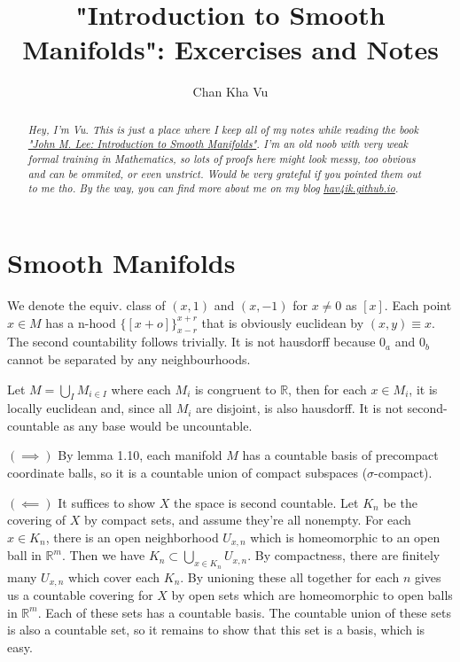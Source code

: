 \documentclass[a4paper]{article}
\title{"Introduction to Smooth Manifolds": Excercises and Notes}
\author{Chan Kha Vu}
\date{}
\begin{document}
\maketitle
\begin{abstract}
\textit{
    Hey, I'm Vu. This is just a place where I keep all of my notes while reading
    the book \href{https://www.springer.com/gp/book/9780387217529}{"John M. Lee: Introduction to Smooth Manifolds"}.
    I'm an old noob with very weak formal training in Mathematics, so lots of proofs here
    might look messy, too obvious and can be ommited, or even unstrict. Would be very
    grateful if you pointed them out to me tho.
    By the way, you can find more about me on my blog \href{https://hav4ik.github.io}{hav4ik.github.io}.
}
\end{abstract}


\section{Smooth Manifolds}
\bigskip

\begin{exercise}[1-1]
    We denote the equiv. class of $(x, 1)$ and $(x, -1)$ for $x \ne 0$ as $[x]$.
    Each point $x \in M$ has a n-hood $\{ [x+o] \}_{x-r}^{x+r}$ that is
    obviously euclidean by $(x, y) \equiv x$. The second countability follows trivially.
    It is not hausdorff because $0_a$ and $0_b$ cannot be separated by any
    neighbourhoods.
\end{exercise}

\begin{exercise}[1-2]
    Let $M = \bigcup_I M_{i\in I}$ where each $M_i$ is congruent to $\mathbb{R}$,
    then for each $x \in M_i$, it is locally euclidean and, since all $M_i$
    are disjoint, is also hausdorff. It is not second-countable as any base
    would be uncountable.
\end{exercise}

\begin{exercise}[1-3]
    $(\implies)$ By lemma 1.10, each manifold $M$ has a countable basis of precompact
    coordinate balls, so it is a countable union of compact subspaces
    ($\sigma$-compact).

    $( \impliedby )$ It suffices to show $X$ the space is second countable.
    Let $K_n$ be the covering of $X$ by compact sets, and assume they're
    all nonempty. For each $x\in K_n$, there is an open neighborhood
    $U_{x,n}$ which is homeomorphic to an open ball in $\mathbb{R}^m$.
    Then we have $K_n\subset \bigcup_{x\in K_n} U_{x,n}$. By compactness,
    there are finitely many $U_{x,n}$ which cover each $K_n$. By unioning these
    all together for each $n$ gives us a countable covering for $X$ by open sets
    which are homeomorphic to open balls in $\mathbb{R}^m$. Each of these sets
    has a countable basis. The countable union of these sets is also a countable
    set, so it remains to show that this set is a basis, which is easy.
\end{exercise}
\end{document}
